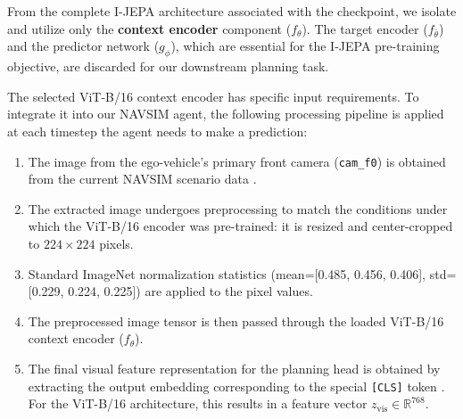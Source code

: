 \documentclass{article}
\begin{document}
From the complete I-JEPA architecture associated with the checkpoint, we isolate and utilize only the \textbf{context encoder} component ($f_\theta$). The target encoder ($f_{\bar{\theta}}$) and the predictor network ($g_\phi$), which are essential for the I-JEPA pre-training objective, are discarded for our downstream planning task.

The selected ViT-B/16 context encoder has specific input requirements. To integrate it into our NAVSIM agent, the following processing pipeline is applied at each timestep the agent needs to make a prediction:
\begin{enumerate}
    \item The image from the ego-vehicle's primary front camera (\texttt{cam\_f0}) is obtained from the current NAVSIM scenario data \cite{dauner2024navsim, OpenScene2023}.
    \item The extracted image undergoes preprocessing to match the conditions under which the ViT-B/16 encoder was pre-trained: it is resized and center-cropped to $224 \times 224$ pixels.
    \item Standard ImageNet normalization statistics (mean=[0.485, 0.456, 0.406], std=[0.229, 0.224, 0.225]) are applied to the pixel values.
    \item The preprocessed image tensor is then passed through the loaded ViT-B/16 context encoder ($f_\theta$).
    \item The final visual feature representation for the planning head is obtained by extracting the output embedding corresponding to the special \texttt{[CLS]} token \cite{dosovitskiy2020vit}. For the ViT-B/16 architecture, this results in a feature vector $z_{\text{vis}} \in \mathbb{R}^{768}$.
\end{enumerate}
\end{document}
